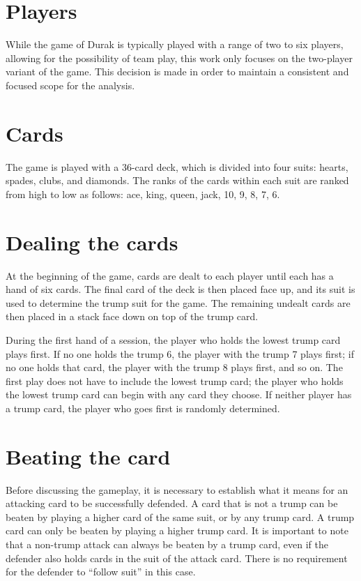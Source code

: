 \section{Players}
While the game of Durak is typically played with a range of two to six players, allowing for the possibility of team play, this work only focuses on the two-player variant of the game. This decision is made in order to maintain a consistent and focused scope for the analysis.

\section{Cards}
The game is played with a 36-card deck, which is divided into four suits: hearts, spades, clubs, and diamonds. The ranks of the cards within each suit are ranked from high to low as follows: ace, king, queen, jack, 10, 9, 8, 7, 6.

\section{Dealing the cards}
At the beginning of the game, cards are dealt to each player until each has a hand of six cards. The final card of the deck is then placed face up, and its suit is used to determine the trump suit for the game. The remaining undealt cards are then placed in a stack face down on top of the trump card.

During the first hand of a session, the player who holds the lowest trump card plays first. If no one holds the trump 6, the player with the trump 7 plays first; if no one holds that card, the player with the trump 8 plays first, and so on. The first play does not have to include the lowest trump card; the player who holds the lowest trump card can begin with any card they choose. If neither player has a trump card, the player who goes first is randomly determined.

\section{Beating the card} 
\label{BeatingRule}
Before discussing the gameplay, it is necessary to establish what it means for an attacking card to be successfully defended. A card that is not a trump can be beaten by playing a higher card of the same suit, or by any trump card. A trump card can only be beaten by playing a higher trump card. It is important to note that a non-trump attack can always be beaten by a trump card, even if the defender also holds cards in the suit of the attack card. There is no requirement for the defender to ``follow suit'' in this case.

